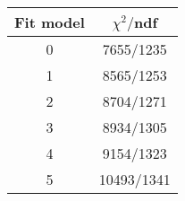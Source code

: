 \begin{tabular}{c|c}
Fit model & $\chi^2/$ndf \\
\hline
0 & 7655/1235\\
1 & 8565/1253\\
2 & 8704/1271\\
3 & 8934/1305\\
4 & 9154/1323\\
5 & 10493/1341\\
\end{tabular}
